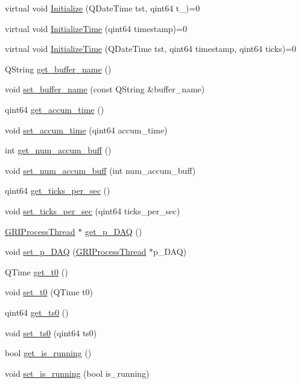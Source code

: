 \begin{DoxyCompactItemize}
\item 
virtual void \hyperlink{classGRIDAQAccumNode_acc2c9717d6a29a09347e92feaa92e190}{\-Initialize} (\-Q\-Date\-Time tst, qint64 t\-\_)=0
\item 
virtual void \hyperlink{classGRIDAQAccumNode_afc32dcdf0b1e70e9d2dc74e36c29740f}{\-Initialize\-Time} (qint64 timestamp)=0
\item 
virtual void \hyperlink{classGRIDAQAccumNode_a4f21d81c03dea662eb9657db00266258}{\-Initialize\-Time} (\-Q\-Date\-Time tst, qint64 timestamp, qint64 ticks)=0
\item 
\-Q\-String \hyperlink{classGRIDAQAccumNode_a4691fc91a32e0a4101d0decd335fb462}{get\-\_\-buffer\-\_\-name} ()
\item 
void \hyperlink{classGRIDAQAccumNode_a2a48d3d76f3300fffe04ea00c4fdd3ac}{set\-\_\-buffer\-\_\-name} (const \-Q\-String \&buffer\-\_\-name)
\item 
qint64 \hyperlink{classGRIDAQAccumNode_af785ec1b1887621c1528cb4b343f9b47}{get\-\_\-accum\-\_\-time} ()
\item 
void \hyperlink{classGRIDAQAccumNode_a502799809c693e60764caa7e74ab7103}{set\-\_\-accum\-\_\-time} (qint64 accum\-\_\-time)
\item 
int \hyperlink{classGRIDAQAccumNode_afe4366f26f6efe380fc5c51ace41f78a}{get\-\_\-num\-\_\-accum\-\_\-buff} ()
\item 
void \hyperlink{classGRIDAQAccumNode_a4fd240d88ff70caf281b6ed6fb24272a}{set\-\_\-num\-\_\-accum\-\_\-buff} (int num\-\_\-accum\-\_\-buff)
\item 
qint64 \hyperlink{classGRIDAQAccumNode_a61ea7160947d2ecae9bcbc4a9dea1955}{get\-\_\-ticks\-\_\-per\-\_\-sec} ()
\item 
void \hyperlink{classGRIDAQAccumNode_ac93ce0fbf6e4847ef84c378675e834d0}{set\-\_\-ticks\-\_\-per\-\_\-sec} (qint64 ticks\-\_\-per\-\_\-sec)
\item 
\hyperlink{classGRIProcessThread}{\-G\-R\-I\-Process\-Thread} $\ast$ \hyperlink{classGRIDAQAccumNode_a730a26714b89054d451b205a73ea363f}{get\-\_\-p\-\_\-\-D\-A\-Q} ()
\item 
void \hyperlink{classGRIDAQAccumNode_af90efbad9593e4fc498fe828ce47ad9f}{set\-\_\-p\-\_\-\-D\-A\-Q} (\hyperlink{classGRIProcessThread}{\-G\-R\-I\-Process\-Thread} $\ast$p\-\_\-\-D\-A\-Q)
\item 
\-Q\-Time \hyperlink{classGRIDAQAccumNode_a229de080e3332cc8465ead360c13e838}{get\-\_\-t0} ()
\item 
void \hyperlink{classGRIDAQAccumNode_ab1b2337c4abf158e7cf21b61db2e8367}{set\-\_\-t0} (\-Q\-Time t0)
\item 
qint64 \hyperlink{classGRIDAQAccumNode_a3030e4cc4372bdabb65fd3d24c79821d}{get\-\_\-ts0} ()
\item 
void \hyperlink{classGRIDAQAccumNode_a84ff74f5c4fcc7cac0d7ae57f6e54b18}{set\-\_\-ts0} (qint64 ts0)
\item 
bool \hyperlink{classGRIDAQAccumNode_a7947dcd73f96eba21fea39d7fe5fa7ba}{get\-\_\-is\-\_\-running} ()
\item 
void \hyperlink{classGRIDAQAccumNode_afe9b512b35d2aa92e7ff454ad54760ed}{set\-\_\-is\-\_\-running} (bool is\-\_\-running)
\end{DoxyCompactItemize}
